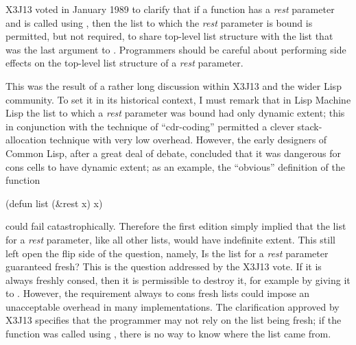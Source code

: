 \begin{new}
X3J13 voted in January 1989
to clarify that if a function has a {\it rest} parameter
and is called using , then the list to which the
{\it rest} parameter is bound is permitted, but not required,
to share top-level list structure with the list that was the last
argument to .  Programmers should be careful about performing
side effects on the top-level list structure of a {\it rest} parameter.

This was the result of a rather long discussion within X3J13 and the
wider Lisp community.  To set it in its historical context, I must remark
that in Lisp Machine Lisp the list to which a {\it rest} parameter was
bound had only dynamic extent; this in conjunction with the
technique of ``cdr-coding'' permitted a clever stack-allocation technique
with very low overhead.  However, the early designers of
Common Lisp, after a great deal of debate, concluded that it was dangerous
for cons cells to have dynamic extent; as an example, the ``obvious''
definition of the function 
\begin{lisp}
(defun list (\&rest x) x)
\end{lisp}
could fail catastrophically.  Therefore the first edition simply implied
that the list for a {\it rest} parameter, like all other lists, would
have indefinite extent.  This still left open the flip side of the
question, namely, Is the list for a {\it rest} parameter guaranteed fresh?
This is the question addressed by the X3J13 vote.
If it is always freshly consed, then it is permissible to destroy it,
for example by giving it to .  However, the requirement always
to cons fresh lists could impose an unacceptable overhead in many implementations.
The clarification approved by X3J13 specifies that the programmer may
not rely on the list being fresh; if the function was called using ,
there is no way to know where the list came from.
\end{new}

